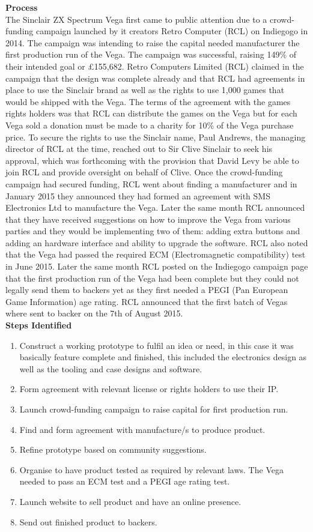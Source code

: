 \textbf{Process}\\
\label{Vega process}
The Sinclair ZX Spectrum Vega first came to public attention due to a crowd-funding campaign launched by it creators Retro Computer (RCL) on Indiegogo in 2014. The campaign was intending to raise the capital needed manufacturer the first production run of the Vega. The campaign was successful, raising 149\% of their intended goal or \pounds 155,682. Retro Computers Limited (RCL) claimed in the campaign that the design was complete already and that RCL had agreements in place to use the Sinclair brand as well as the rights to use 1,000 games that would be shipped with the Vega. The terms of the agreement with the games rights holders was that RCL can distribute the games on the Vega but for each Vega sold a donation must be made to a charity for 10\% of the Vega purchase price. To secure the rights to use the Sinclair name, Paul Andrews, the managing director of RCL at the time, reached out to Sir Clive Sinclair to seek his approval, which was forthcoming with the provision that David Levy be able to join RCL and provide oversight on behalf of Clive. Once the crowd-funding campaign had secured funding, RCL went about finding a manufacturer and in January 2015 they announced they had formed an agreement with SMS Electronics Ltd to manufacture the Vega. Later the same month RCL announced that they have received suggestions on how to improve the Vega from various parties and they would be implementing two of them: adding extra buttons and adding an hardware interface and ability to upgrade the software. RCL also noted that the Vega had passed the required ECM (Electromagnetic compatibility) test in June 2015. Later the same month RCL posted on the Indiegogo campaign page that the first production run of the Vega had been complete but they could not legally send them to backers yet as they first needed a PEGI (Pan European Game Information) age rating. RCL announced that the first batch of Vegas where sent to backer on the 7th of August 2015.\\

\textbf{Steps Identified}
\begin{enumerate}
\item Construct a working prototype to fulfil an idea or need, in this case it was basically feature complete and finished, this included the electronics design as well as the tooling and case designs and software. 
\item Form agreement with relevant license or rights holders to use their IP.
\item Launch crowd-funding campaign to raise capital for first production run.
\item Find and form agreement with manufacture/s to produce product.
\item Refine prototype based on community suggestions.
\item Organise to have product tested as required by relevant laws. The Vega needed to pass an ECM test and a PEGI age rating test.
\item Launch website to sell product and have an online presence.
\item Send out finished product to backers.
\end{enumerate} 

